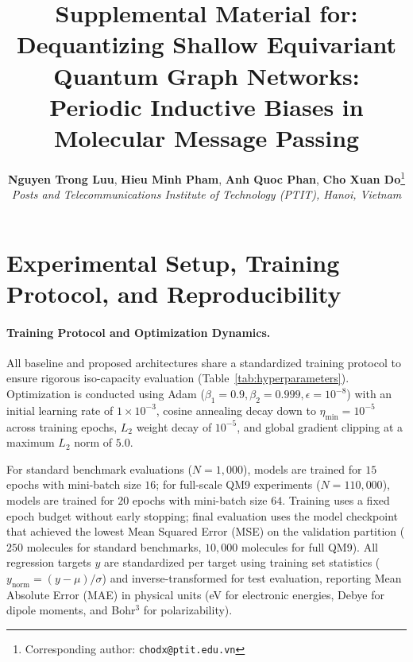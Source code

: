 \documentclass[10pt,twocolumn,letterpaper]{article}
\title{\textbf{Supplemental Material for:\\Dequantizing Shallow Equivariant Quantum Graph Networks:\\Periodic Inductive Biases in Molecular Message Passing}}
\author{
    \textbf{Nguyen Trong Luu}, \textbf{Hieu Minh Pham}, \textbf{Anh Quoc Phan}, \textbf{Cho Xuan Do}\thanks{Corresponding author: \texttt{chodx@ptit.edu.vn}} \\
    \textit{Posts and Telecommunications Institute of Technology (PTIT), Hanoi, Vietnam}
}
\date{}
\begin{document}
\maketitle

\setcounter{section}{0}
\renewcommand{\thesection}{SM \Alph{section}}
\renewcommand{\thefigure}{S\arabic{figure}}
\renewcommand{\thetable}{S\arabic{table}}

\section{Experimental Setup, Training Protocol, and Reproducibility}
\label{sec:sm_hyperparameters}
\label{sm:setup}



\paragraph{Training Protocol and Optimization Dynamics.}
All baseline and proposed architectures share a standardized training protocol to ensure rigorous iso-capacity evaluation (Table~\ref{tab:hyperparameters}). Optimization is conducted using Adam ($\beta_1 = 0.9, \beta_2 = 0.999, \epsilon = 10^{-8}$) with an initial learning rate of $1 \times 10^{-3}$, cosine annealing decay down to $\eta_{\mathrm{min}} = 10^{-5}$ across training epochs, $L_2$ weight decay of $10^{-5}$, and global gradient clipping at a maximum $L_2$ norm of $5.0$.

For standard benchmark evaluations ($N = 1{,}000$), models are trained for $15$ epochs with mini-batch size $16$; for full-scale QM9 experiments ($N = 110{,}000$), models are trained for $20$ epochs with mini-batch size $64$. Training uses a fixed epoch budget without early stopping; final evaluation uses the model checkpoint that achieved the lowest Mean Squared Error (MSE) on the validation partition ($250$ molecules for standard benchmarks, $10{,}000$ molecules for full QM9). All regression targets $y$ are standardized per target using training set statistics ($y_{\mathrm{norm}} = (y - \mu)/\sigma$) and inverse-transformed for test evaluation, reporting Mean Absolute Error (MAE) in physical units (eV for electronic energies, Debye for dipole moments, and Bohr$^3$ for polarizability).
\end{document}
